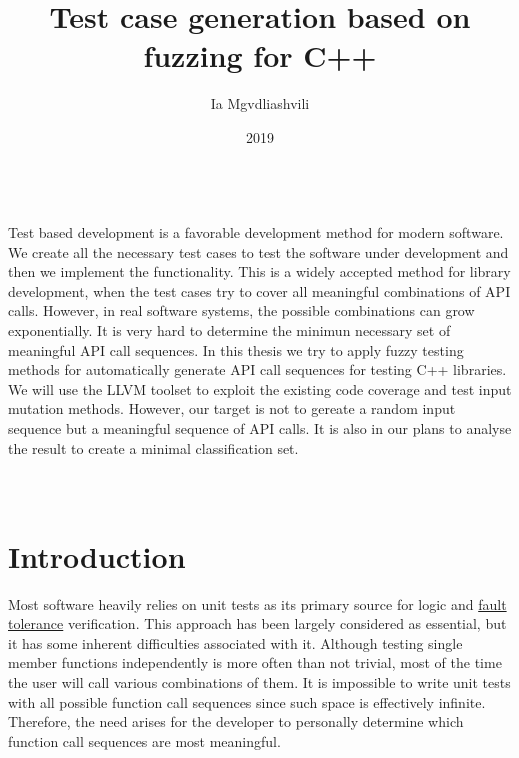 \documentclass{elteikthesis}[2018/06/06]
\date{2019}
\affiliation{Associate Professor}
\author{Ia Mgvdliashvili}
\date{}
\title{Test case generation based on fuzzing for C++}
\begin{document}
\maketitle

\begin{export}
\begin{document} \\
\begin{titlepage}
\end{titlepage}
\end{export}

\vspace*{\fill} \\
Test based development is a favorable development method for modern software. We create all the necessary test cases to test the software under development and then we implement the functionality. This is a widely accepted method for library development, when the test cases try to cover all meaningful combinations of API calls. However, in real software systems, the possible combinations can grow exponentially. It is very hard to determine the minimun necessary set of meaningful API call sequences. In this thesis we try to apply fuzzy testing methods for automatically generate API call sequences for testing C++ libraries. We will use the LLVM toolset to exploit the existing code coverage and test input mutation methods. However, our target is not to gereate a random input sequence but a meaningful sequence of API calls. It is also in our plans to analyse the result to create a minimal classification set. \\

\vspace*{\fill} \\
\cleardoublepage \\
\setcounter{tocdepth}{0}
\tableofcontents

\chapter{Introduction}
\label{sec-1}
Most software heavily relies on unit tests as its primary source for logic and \uline{fault tolerance} verification. This approach has been largely considered as essential, but it has some inherent difficulties associated with it. Although testing single member functions independently is more often than not trivial, most of the time the user will call various combinations of them. It is impossible to write unit tests with all possible function call sequences since such space is effectively infinite. Therefore, the need arises for the developer to personally determine which function call sequences are most meaningful. \\
\end{document}
